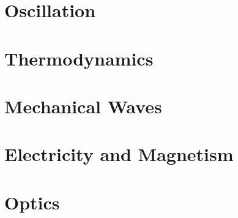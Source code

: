 \documentclass[english,twoside]{labmanual} %
\begin{document}
\part{Oscillation}




%
%
%

\part{Thermodynamics}


%


%
%

\part{Mechanical Waves}




\part{Electricity and Magnetism}


%










\part{Optics}








\end{document}
